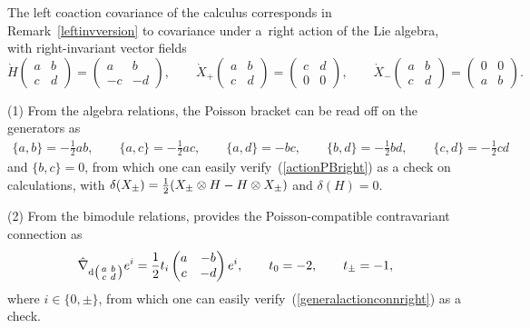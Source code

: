 \documentclass[10pt,a4paper]{amsart}
\numberwithin{equation}{section}
\newcommand{\<}{{\langle}}
\renewcommand{\>}{{\rangle}}
\newcommand{\tens}{\otimes}
\newcommand{\extd}{{\rm d}}
\newcommand{\tilder}{\grave}
\begin{document}
\begin{Example}
The left coaction covariance of the calculus corresponds in Remark~\ref{leftinvversion} to covariance under a~right action of the Lie algebra, with right-invariant vector fields
\[ \tilder H\begin{pmatrix} a & b \\ c & d \end{pmatrix}=\begin{pmatrix} a & b \\ -c & -d \end{pmatrix},\qquad \tilder X_+\begin{pmatrix} a & b \\ c & d \end{pmatrix}=\begin{pmatrix} c & d \\ 0 & 0 \end{pmatrix},\qquad \tilder X_-\begin{pmatrix} a & b \\ c & d \end{pmatrix}=\begin{pmatrix} 0 & 0 \\ a & b \end{pmatrix}. \]

(1) From the algebra relations, the Poisson bracket can be read off on the generators as
\begin{gather*} \lbrace a,b\rbrace=-\tfrac{1}{2} ab,\qquad\! \lbrace a,c\rbrace=-\tfrac{1}{2}ac,\qquad\! \lbrace a,d\rbrace=-bc, \qquad\! \lbrace b,d\rbrace=-\tfrac{1}{2}bd,\qquad\! \lbrace c,d\rbrace=-\tfrac{1}{2}cd\end{gather*}
and $\lbrace b,c\rbrace=0$, from which one can easily verify~(\ref{actionPBright}) as a check on calculations, with $\delta(X_\pm)={1\over2}(X_\pm\tens H-H\tens X_\pm)$ and $\delta(H)=0$.

(2) From the bimodule relations, \cite{MaTao:plg} provides the Poisson-compatible contravariant connection as
\[ \hat\nabla_{\extd \left(\begin{smallmatrix} a & b \\ c & d \end{smallmatrix}\right)}e^i={1\over 2}t_i \begin{pmatrix} a & -b \\ c & -d \end{pmatrix}e^i,\qquad t_0=-2,\qquad t_\pm=-1, \]
where $i\in\lbrace 0,\pm\rbrace$, from which one can easily verify~(\ref{generalactionconnright}) as a check.
\end{Example}
\end{document}
